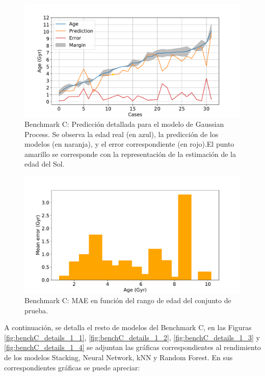 \begin{figure}[H]
\begin{center}
 \includegraphics[width=0.8\linewidth]{Figuras/Experimentos/B_C_gp_2.pdf}
\end{center}
\caption{Benchmark C: Predicción detallada para el modelo de Gaussian Process. Se observa la edad real (en azul), la predicción de los modelos (en naranja), y el error correspondiente (en rojo).El punto amarillo se corresponde con la representación de la estimación de la edad del Sol.}
 \label{fig:benchC_best_2}
\end{figure}

\begin{figure}[H]
\begin{center}
 \includegraphics[width=0.8\linewidth]{Figuras/Experimentos/B_C_gp_3.pdf}
\end{center}
\caption{Benchmark C: MAE en función del rango de edad del conjunto de prueba.}
 \label{fig:benchC_best_3}
\end{figure}

A continuación, se detalla el resto de modelos del Benchmark C, en las Figuras \ref{fig:benchC_details_1_1}, \ref{fig:benchC_details_1_2}, \ref{fig:benchC_details_1_3} y \ref{fig:benchC_details_1_4} se adjuntan las gráficas correspondientes al rendimiento de los modelos Stacking, Neural Network, kNN y Random Forest. En sus correspondientes gráficas se puede apreciar:

